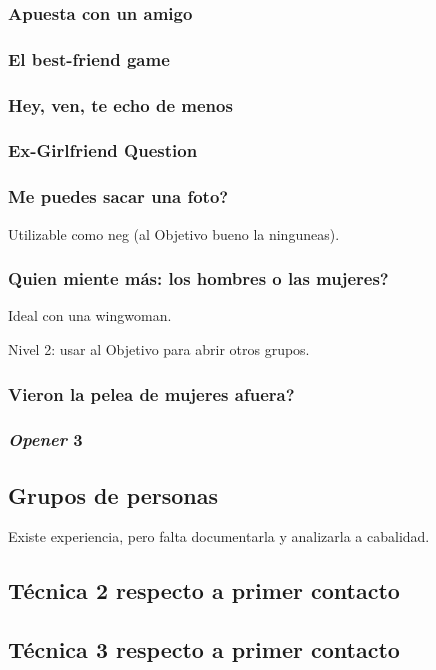 \documentclass{article}
\begin{document}
\subsubsection{Apuesta con un amigo}

\subsubsection{El best-friend game}

\subsubsection{Hey, ven, te echo de menos}

\subsubsection{Ex-Girlfriend Question}

\subsubsection{Me puedes sacar una foto?}
Utilizable como neg (al Objetivo bueno la ninguneas).

\subsubsection{Quien miente más: los hombres o las mujeres?}
Ideal con una wingwoman.

Nivel 2: usar al Objetivo para abrir otros grupos.

\subsubsection{Vieron la pelea de mujeres afuera?}
\subsubsection{\textit{Opener} 3}
\subsection{Grupos de personas \label{ssec:gruposDePersonas}}
{\color{red} Existe experiencia, pero falta documentarla y analizarla a cabalidad.}
\subsection{Técnica 2 respecto a primer contacto}
\subsection{Técnica 3 respecto a primer contacto}
\end{document}

